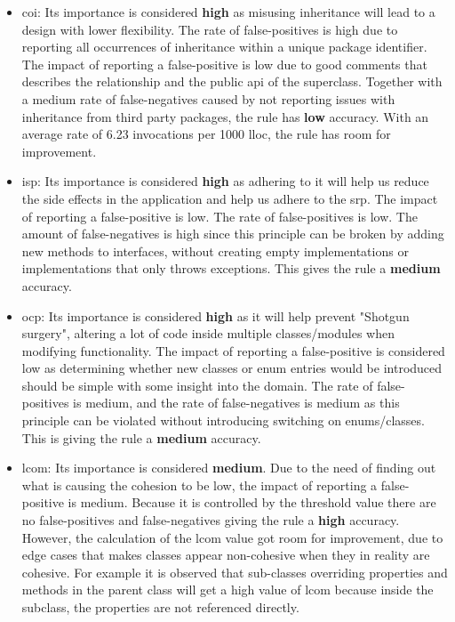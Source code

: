 \documentclass{report}
\begin{document}
\begin{itemize}

    \item \gls{coi}: Its importance is considered \textbf{high} as misusing inheritance will lead to a design with lower flexibility. The rate of false-positives is high due to reporting all occurrences of inheritance within a unique package identifier. The impact of reporting a false-positive is low due to good comments that describes the relationship and the public \gls{api} of the superclass. Together with a medium rate of false-negatives caused by not reporting issues with inheritance from third party packages, the rule has \textbf{low} accuracy. With an average rate of 6.23 invocations per 1000 lloc, the rule has room for improvement.

    \item \gls{isp}: Its importance is considered \textbf{high} as adhering to it will help us reduce the side effects in the application and help us adhere to the \gls{srp}. The impact of reporting a false-positive is low. The rate of false-positives is low. The amount of false-negatives is high since this principle can be broken by adding new methods to interfaces, without creating empty implementations or implementations that only throws exceptions. This gives the rule a \textbf{medium} accuracy.
    
    \item \gls{ocp}: Its importance is considered \textbf{high} as it will help prevent "Shotgun surgery", altering a lot of code inside multiple classes/modules when modifying functionality. The impact of reporting a false-positive is considered low as determining whether new classes or enum entries would be introduced should be simple with some insight into the domain. The rate of false-positives is medium, and the rate of false-negatives is medium as this principle can be violated without introducing switching on enums/classes. This is giving the rule a \textbf{medium} accuracy.
    
    \item \gls{lcom}: Its importance is considered \textbf{medium}. Due to the need of finding out what is causing the cohesion to be low, the impact of reporting a false-positive is medium. Because it is controlled by the threshold value there are no false-positives and false-negatives giving the rule a \textbf{high} accuracy. However, the calculation of the \gls{lcom} value got room for improvement, due to edge cases that makes classes appear non-cohesive when they in reality are cohesive. For example it is observed that sub-classes overriding properties and methods in the parent class will get a high value of \gls{lcom} because inside the subclass, the properties are not referenced directly. 

\end{itemize}
\end{document}
